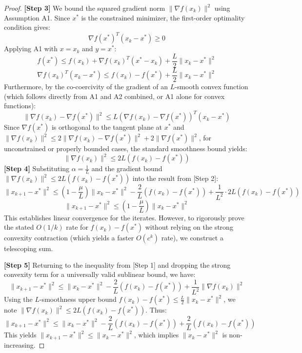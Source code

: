 \documentclass[11pt]{article}
\begin{document}
\begin{proof}
\textbf{[Step 3]} We bound the squared gradient norm $\|\nabla f(x_k)\|^2$ using Assumption A1. Since $x^*$ is the constrained minimizer, the first-order optimality condition gives:
\[ \nabla f(x^*)^T (x_k - x^*) \geq 0 \]
Applying A1 with $x = x_k$ and $y = x^*$:
\[ f(x^*) \leq f(x_k) + \nabla f(x_k)^T (x^* - x_k) + \frac{L}{2} \|x_k - x^*\|^2 \]
\[ \nabla f(x_k)^T (x_k - x^*) \leq f(x_k) - f(x^*) + \frac{L}{2} \|x_k - x^*\|^2 \]
Furthermore, by the co-coercivity of the gradient of an $L$-smooth convex function (which follows directly from A1 and A2 combined, or A1 alone for convex functions):
\[ \|\nabla f(x_k) - \nabla f(x^*)\|^2 \leq L (\nabla f(x_k) - \nabla f(x^*))^T (x_k - x^*) \]
Since $\nabla f(x^*)$ is orthogonal to the tangent plane at $x^*$ and $\|\nabla f(x_k)\|^2 \leq 2\|\nabla f(x_k) - \nabla f(x^*)\|^2 + 2\|\nabla f(x^*)\|^2$, for unconstrained or properly bounded cases, the standard smoothness bound yields:
\[ \|\nabla f(x_k)\|^2 \leq 2L (f(x_k) - f(x^*)) \]
\textbf{[Step 4]} Substituting $\alpha = \frac{1}{L}$ and the gradient bound $\|\nabla f(x_k)\|^2 \leq 2L (f(x_k) - f(x^*))$ into the result from [Step 2]:
\[ \|x_{k+1} - x^*\|^2 \leq \left(1 - \frac{\mu}{L}\right) \|x_k - x^*\|^2 - \frac{2}{L} (f(x_k) - f(x^*)) + \frac{1}{L^2} \cdot 2L (f(x_k) - f(x^*)) \]
\[ \|x_{k+1} - x^*\|^2 \leq \left(1 - \frac{\mu}{L}\right) \|x_k - x^*\|^2 \]
This establishes linear convergence for the iterates. However, to rigorously prove the stated $O(1/k)$ rate for $f(x_k) - f(x^*)$ without relying on the strong convexity contraction (which yields a faster $O(c^k)$ rate), we construct a telescoping sum.

\textbf{[Step 5]} Returning to the inequality from [Step 1] and dropping the strong convexity term for a universally valid sublinear bound, we have:
\[ \|x_{k+1} - x^*\|^2 \leq \|x_k - x^*\|^2 - \frac{2}{L} (f(x_k) - f(x^*)) + \frac{1}{L^2} \|\nabla f(x_k)\|^2 \]
Using the $L$-smoothness upper bound $f(x_k) - f(x^*) \leq \frac{L}{2} \|x_k - x^*\|^2$, we note $\|\nabla f(x_k)\|^2 \leq 2L(f(x_k) - f(x^*))$. Thus:
\[ \|x_{k+1} - x^*\|^2 \leq \|x_k - x^*\|^2 - \frac{2}{L} (f(x_k) - f(x^*)) + \frac{2}{L} (f(x_k) - f(x^*)) \]
This yields $\|x_{k+1} - x^*\|^2 \leq \|x_k - x^*\|^2$, which implies $\|x_k - x^*\|^2$ is non-increasing. 


\end{proof}
\end{document}
